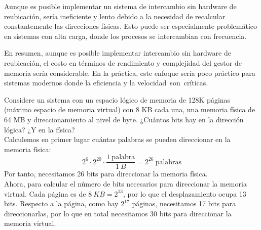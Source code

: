 \begin{ejercicio}
\begin{itemize}
    Aunque es posible implementar un sistema de intercambio sin hardware de reubicación, sería ineficiente y lento debido a la necesidad de recalcular constantemente las direcciones físicas. Esto puede ser especialmente problemático en sistemas con alta carga, donde los procesos se intercambian con frecuencia.
\end{itemize}

En resumen, aunque es posible implementar intercambio sin hardware de reubicación, el costo en términos de rendimiento y complejidad del gestor de memoria sería considerable. En la práctica, este enfoque sería poco práctico para sistemas modernos donde la eficiencia y la velocidad son críticas.
\end{ejercicio}

\begin{ejercicio}
Considere un sistema con un espacio lógico de memoria de 128K páginas (máximo espacio de memoria virtual) con 8 KB cada una, una memoria física de 64 MB y direccionamiento al nivel de byte. ¿Cuántos bits hay en la dirección lógica? ¿Y en la física?\\

Calculemos en primer lugar cuántas palabras se pueden direccionar en la memoria física:
\begin{equation*}
    2^6\cdot 2^{20} \cdot \frac{1~\text{palabra}}{1~B} = 2^{26}~\text{palabras}
\end{equation*}
Por tanto, necesitamos 26 bits para direccionar la memoria física.\\

Ahora, para calcular el número de bits necesarios para direccionar la memoria virtual.
Cada página es de $8~KB=2^{13}$, por lo que el desplazamiento ocupa 13 bits.
Respecto a la página, como hay $2^{17}$ páginas, necesitamos 17 bits para direccionarlas,
por lo que en total necesitamos 30 bits para direccionar la memoria virtual.
\end{ejercicio}

